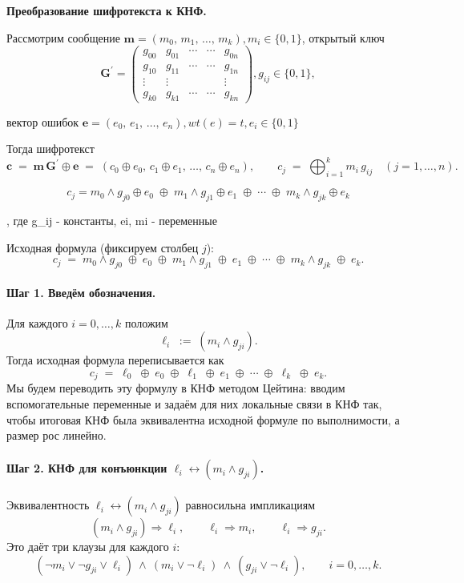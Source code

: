 \noindent\textbf{Преобразование шифротекста к КНФ.}


Рассмотрим сообщение $\mathbf{m} = (m_0,\, m_1,\, \ldots,\, m_k), m_i \in \{0,1\}$, открытый ключ \[
\mathbf{G}^{\prime} =
\begin{pmatrix}
g_{00} & g_{01} & \cdots & \cdots & g_{0n} \\
g_{10} & g_{11} & \cdots & \cdots & g_{1n} \\
\vdots & \vdots &        &        & \vdots \\
g_{k0} & g_{k1} & \cdots & \cdots & g_{kn}
\end{pmatrix}, g_{ij} \in \{0,1\}, 
\]

вектор ошибок $\mathbf{e} = (e_0,\, e_1,\, \ldots,\, e_n), wt(e) = t, e_i \in \{0,1\}$

Тогда шифротекст
\[
\mathbf{c} \;=\; \mathbf{m}\,\mathbf{G}^{\prime} \oplus \mathbf{e}
\;=\; (c_0 \oplus e_0,\,c_1 \oplus e_1,\,\ldots,\,c_n \oplus e_n), 
\qquad
c_j \;=\; \bigoplus_{i=1}^{k} m_i\, g_{ij}\quad (j=1,\ldots,n).
\]

 
\[
c_j = m_0 \wedge g_{j0} \oplus e_0 \;\oplus\;
       m_1 \wedge g_{j1} \oplus e_1 \;\oplus\;
       \cdots \;\oplus\;
       m_k \wedge g_{jk} \oplus e_k
\]

, где g_ij - константы, ei, mi - переменные



Исходная формула (фиксируем столбец $j$):
\[
c_j \;=\; m_0 \wedge g_{j0} \;\oplus\; e_0 \;\oplus\; m_1 \wedge g_{j1} \;\oplus\; e_1 \;\oplus\; \cdots \;\oplus\; m_k \wedge g_{jk} \;\oplus\; e_k .
\]

\paragraph{Шаг 1. Введём обозначения.}
Для каждого $i=0,\ldots,k$ положим
\[
\ell_i \;:=\; (m_i \wedge g_{ji}).
\]
Тогда исходная формула переписывается как
\[
c_j \;=\; \ell_0 \;\oplus\; e_0 \;\oplus\; \ell_1 \;\oplus\; e_1 \;\oplus\; \cdots \;\oplus\; \ell_k \;\oplus\; e_k .
\]
Мы будем переводить эту формулу в КНФ методом Цейтина: вводим вспомогательные переменные и задаём для них локальные связи в КНФ так, чтобы итоговая КНФ была эквивалентна исходной формуле по выполнимости, а размер рос линейно.

\paragraph{Шаг 2. КНФ для конъюнкции $\ell_i \leftrightarrow (m_i \wedge g_{ji})$.}
Эквивалентность $\ell_i \leftrightarrow (m_i \wedge g_{ji})$ равносильна импликациям
\[
(m_i \wedge g_{ji}) \Rightarrow \ell_i, \qquad
\ell_i \Rightarrow m_i, \qquad
\ell_i \Rightarrow g_{ji}.
\]
Это даёт три клаузы для каждого $i$:
\[
(\neg m_i \lor \neg g_{ji} \lor \ell_i)
\ \land\ 
(m_i \lor \neg \ell_i)
\ \land\ 
(g_{ji} \lor \neg \ell_i),
\qquad i=0,\ldots,k.
\]

